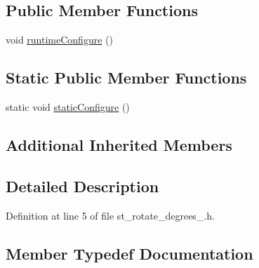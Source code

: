 \subsection*{Public Member Functions}
\begin{DoxyCompactItemize}
\item 
void \hyperlink{structsm__dance__bot__strikes__back_1_1StRotateDegrees2_a5deec1794efd564280833dd687c5a436}{runtime\+Configure} ()
\end{DoxyCompactItemize}
\subsection*{Static Public Member Functions}
\begin{DoxyCompactItemize}
\item 
static void \hyperlink{structsm__dance__bot__strikes__back_1_1StRotateDegrees2_af1e939b6d83665b725ecba04323333d6}{static\+Configure} ()
\end{DoxyCompactItemize}
\subsection*{Additional Inherited Members}


\subsection{Detailed Description}


Definition at line 5 of file st\+\_\+rotate\+\_\+degrees\+\_.\+h.



\subsection{Member Typedef Documentation}
\mbox{\label{structsm__dance__bot__strikes__back_1_1StRotateDegrees2_a15ea014ebb51ef518b9d757812973351}} 
